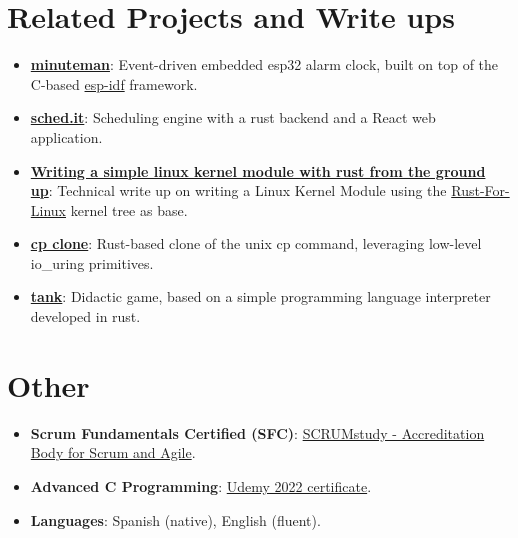 \documentclass[letterpaper,11pt]{article}
\newcommand{\resumeItem}[2]{
  \item\small{
    \textbf{#1}{: #2 \vspace{-2pt}}
  }
}
\newcommand{\resumeSubItem}[2]{\resumeItem{#1}{#2}\vspace{-4pt}}
\newcommand{\resumeSubHeadingListStart}{\begin{itemize}[leftmargin=*]}
\newcommand{\resumeSubHeadingListEnd}{\end{itemize}}
\begin{document}
\section{Related Projects and Write ups}
\resumeSubHeadingListStart
\resumeSubItem{\href{https://github.com/ccarral/minuteman}{minuteman}}
{Event-driven embedded esp32 alarm clock, built on top of the C-based \href{https://github.com/espressif/esp-idf}{esp-idf} framework.}
\resumeSubItem{\href{https://ccarral.github.io/schedit-client/?pools=https://ccarral.github.io/schedit-client/files/plantillaA.csv}{sched.it}}
{Scheduling engine with a rust backend and a React web application.}
\resumeSubItem{\href{https://ccarral.github.io/en/projects/hello_world_kernel_module/}{Writing
		a simple linux kernel module with rust from the ground up}}{Technical
	write up on writing a Linux Kernel Module using the
	\href{https://github.com/Rust-for-Linux}{Rust-For-Linux} kernel tree
	as base.}
\resumeSubItem{\href{https://github.com/ccarral/cp_liburing}{cp clone}}
{Rust-based clone of the unix cp command, leveraging low-level io\_uring primitives.}
\resumeSubItem{\href{https://github.com/ccarral/tank-vue}{tank}}
{Didactic game, based on a simple programming language interpreter developed in rust.}

\resumeSubHeadingListEnd

\section{Other}
\resumeSubHeadingListStart
\resumeSubItem{Scrum Fundamentals Certified (SFC)}{
	\href{https://www.scrumstudy.com/certification/verify?type=SFC&number=931455}{SCRUMstudy - Accreditation Body for Scrum and Agile}.}
\resumeSubItem{Advanced C
	Programming}{\href{https://ude.my/UC-0dadf9b3-11ae-4f4d-8a76-6f1aa45b2b53/}{Udemy
		2022 certificate}.}
\resumeSubItem{Languages}{Spanish (native), English (fluent).}
\resumeSubHeadingListEnd
\end{document}
